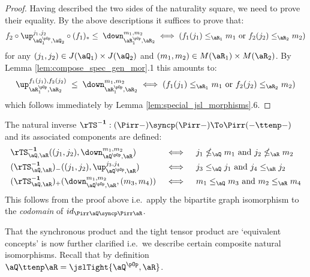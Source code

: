 \documentclass{article}
\begin{document}
\begin{proof}
Having described the two sides of the naturality square, we need to prove their equality. By the above descriptions it suffices to prove that:
\[
f_2 \circ \up_{\aQ_1^{\pOp},\aQ_2}^{j_1,j_2} \circ (f_1)_* \leq \; \down_{\aR_1^{\pOp},\aR_2}^{m_1,m_2}
\iff
(f_1(j_1) \leq_{\aR_1} m_1 \text{ or } f_2(j_2) \leq_{\aR_2} m_2)
\]
for any $(j_1,j_2) \in J(\aQ_1) \times J(\aQ_2)$ and $(m_1,m_2) \in M(\aR_1) \times M(\aR_2)$. By Lemma \ref{lem:compose_spec_gen_mor}.1 this amounts to:
\[
\up_{\aR_1^{\pOp},\aR_2}^{f_1(j_1),f_2(j_2)} \; \leq \; \down_{\aR_1^{\pOp},\aR_2}^{m_1,m_2}
\iff
(f_1(j_1) \leq_{\aR_1} m_1 \text{ or } f_2(j_2) \leq_{\aR_2} m_2)
\]
which follows immediately by Lemma \ref{lem:special_jsl_morphisms}.6.
\end{proof}

\begin{note}
\label{note:ts_nat_inverse}
The natural inverse $\rTS^{\bf-1} : (\Pirr -) \syncp (\Pirr -) \To \Pirr(- \ttenp -)$ and its associated components are defined:
\[
\begin{tabular}{lll}
$\rTS_{\aQ,\aR}^{\bf-1}((j_1,j_2),\down_{\aQ^{\pOp},\aR}^{m_1,m_2})$
& $\iff$ &
$j_1 \nleq_\aQ m_1$ and $j_2 \nleq_\aR m_2$
\\[1ex]
$(\rTS_{\aQ,\aR}^{\bf-1})_-((j_1,j_2),\up_{\aQ^{\pOp},\aR}^{j_3,j_4})$
& $\iff$ &
$j_3 \leq_\aQ j_1$ and $j_4 \leq_\aR j_2$
\\[1ex]
$(\rTS_{\aQ,\aR}^{\bf-1})_+(\down_{\aQ^{\pOp},\aR}^{m_1,m_2},(m_3,m_4))$
& $\iff$ &
$m_1 \leq_\aQ m_3$ and $m_2 \leq_\aR m_4$
\end{tabular}
\]
This follows from the proof above i.e.\ apply the bipartite graph isomorphism to the \emph{codomain} of $id_{\Pirr\aQ \syncp \Pirr\aR}$. \endbox
\end{note}

That the synchronous product and the tight tensor product are `equivalent concepts' is now further clarified i.e.\ we describe certain composite natural isomorphisms. Recall that by definition $\aQ \ttenp \aR = \jslTight{\aQ^{\pOp},\aR}$.
\end{document}
